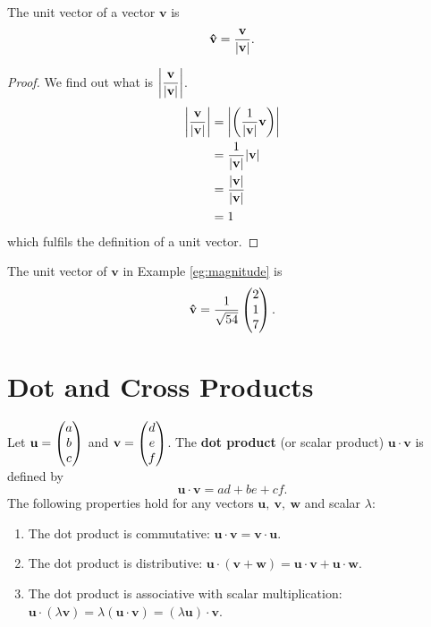 \documentclass[12pt]{article}
\renewcommand{\vec}{\mathbf}
\begin{document}
\begin{thm}
	The unit vector of a vector \(\vec{v}\) is 
	\[ \vec{\hat{v}} = \frac{\vec{v}}{\abs{\vec{v}}}. \] 
\end{thm}

\begin{proof}
	We find out what is \(\displaystyle \abs*{\frac{\vec{v}}{\abs{\vec{v}}}}\).
	\begin{align*}
		\abs*{ \frac{\vec{v}}{\abs{\vec{v}}} } &= \abs*{ \left( \frac{1}{\abs{\vec{v}}} \vec{v} \right) } \\
											   &= \frac{1}{\abs{\vec{v}}} \abs{\vec{v}} \\
											   &= \frac{\abs{\vec{v}}}{\abs{\vec{v}}} \\
											   &= 1
	\end{align*}
	which fulfils the definition of a unit vector.
\end{proof}

\begin{eg}
	The unit vector of \(\vec{v}\) in Example \ref{eg:magnitude} is 
	\[ \vec{\hat{v}} = \frac{1}{\sqrt{54}} \cvec{2 \\ 1 \\ 7}. \] 
\end{eg}

\section{Dot and Cross Products}
\begin{defn}
	Let \(\vec{u} = \cvec{a \\ b \\ c}\) and \(\vec{v} = \cvec{d \\ e \\ f}\).
	The \textbf{dot product} (or scalar product) \(\vec{u} \cdot \vec{v}\) is defined by
	\[ \vec{u} \cdot \vec{v} = ad + be + cf. \] 
	The following properties hold for any vectors \(\vec{u},\ \vec{v},\ \vec{w}\) and scalar \(\lambda\):
	\begin{enumerate}
		\item The dot product is commutative: \(\vec{u} \cdot \vec{v} = \vec{v} \cdot \vec{u}\).
		\item The dot product is distributive: \(\vec{u} \cdot (\vec{v} + \vec{w}) = \vec{u} \cdot \vec{v} + \vec{u} \cdot \vec{w}\).
		\item The dot product is associative with scalar multiplication: \(\vec{u} \cdot (\lambda \vec{v}) = \lambda (\vec{u} \cdot \vec{v}) = (\lambda \vec{u}) \cdot \vec{v}\). 
	\end{enumerate}
\end{defn}
\end{document}
